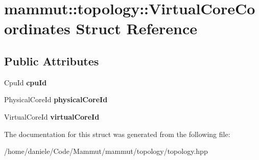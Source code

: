 \hypertarget{structmammut_1_1topology_1_1VirtualCoreCoordinates}{\section{mammut\-:\-:topology\-:\-:Virtual\-Core\-Coordinates Struct Reference}
\label{structmammut_1_1topology_1_1VirtualCoreCoordinates}
}
\subsection*{Public Attributes}
\begin{DoxyCompactItemize}
\item 
\hypertarget{structmammut_1_1topology_1_1VirtualCoreCoordinates_af040bfac88a5f4ac6e3e7df9a316b9e9}{Cpu\-Id {\bfseries cpu\-Id}}\label{structmammut_1_1topology_1_1VirtualCoreCoordinates_af040bfac88a5f4ac6e3e7df9a316b9e9}

\item 
\hypertarget{structmammut_1_1topology_1_1VirtualCoreCoordinates_ad1029daa743f9288dd54a7de26e2b501}{Physical\-Core\-Id {\bfseries physical\-Core\-Id}}\label{structmammut_1_1topology_1_1VirtualCoreCoordinates_ad1029daa743f9288dd54a7de26e2b501}

\item 
\hypertarget{structmammut_1_1topology_1_1VirtualCoreCoordinates_a9e39fa2bd3806f1b6edcf092f9b14bc2}{Virtual\-Core\-Id {\bfseries virtual\-Core\-Id}}\label{structmammut_1_1topology_1_1VirtualCoreCoordinates_a9e39fa2bd3806f1b6edcf092f9b14bc2}

\end{DoxyCompactItemize}


The documentation for this struct was generated from the following file\-:\begin{DoxyCompactItemize}
\item 
/home/daniele/\-Code/\-Mammut/mammut/topology/topology.\-hpp\end{DoxyCompactItemize}
